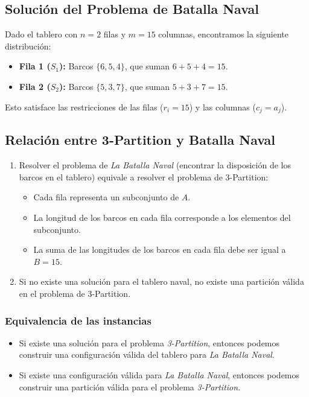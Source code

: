 \subsection*{Solución del Problema de Batalla Naval}

Dado el tablero con $n = 2$ filas y $m = 15$ columnas, encontramos la siguiente distribución:

\begin{itemize}
    \item \textbf{Fila 1 ($S_1$):} Barcos $\{6, 5, 4\}$, que suman $6 + 5 + 4 = 15$.
    \item \textbf{Fila 2 ($S_2$):} Barcos $\{5, 3, 7\}$, que suman $5 + 3 + 7 = 15$.
\end{itemize}

Esto satisface las restricciones de las filas ($r_i = 15$) y las columnas ($c_j = a_j$).

\subsection*{Relación entre 3-Partition y Batalla Naval}

\begin{enumerate}
    \item Resolver el problema de \textit{La Batalla Naval} (encontrar la disposición de los barcos en el tablero) equivale a resolver el problema de 3-Partition:
    \begin{itemize}
        \item Cada fila representa un subconjunto de $A$.
        \item La longitud de los barcos en cada fila corresponde a los elementos del subconjunto.
        \item La suma de las longitudes de los barcos en cada fila debe ser igual a $B = 15$.
    \end{itemize}

    \item Si no existe una solución para el tablero naval, no existe una partición válida en el problema de 3-Partition.
\end{enumerate}


\subsubsection*{Equivalencia de las instancias}

\begin{itemize}
    \item Si existe una solución para el problema \textit{3-Partition}, entonces podemos construir una configuración válida del tablero para \textit{La Batalla Naval}.
    \item Si existe una configuración válida para \textit{La Batalla Naval}, entonces podemos construir una partición válida para el problema \textit{3-Partition}.
\end{itemize}

